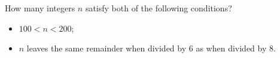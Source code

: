 How many integers $n$ satisfy both of the following conditions?
\begin{itemize}
\item $100<n<200$;
\item $n$ leaves the same remainder when divided by $6$ as when divided by $8$.
\end{itemize}
